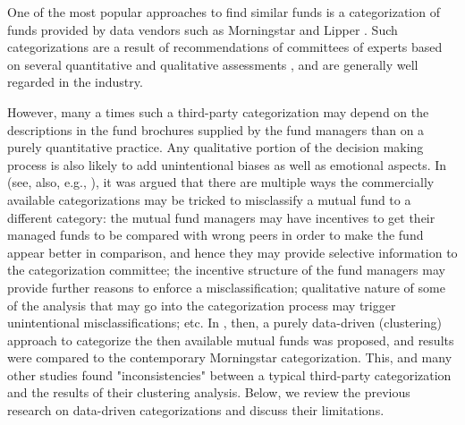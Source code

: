 \documentclass[sigconf]{acmart}
\begin{document}
One of the most popular approaches to find similar funds is a categorization of funds provided by data vendors such as Morningstar \cite{morningstarglobalcategory} and Lipper \cite{lippercategory}. Such categorizations are a result of recommendations of committees of experts based on several quantitative and qualitative assessments \cite{morningstarequitysectorbreakdown}, and are generally well regarded in the industry. 


However, many a times such a third-party categorization may depend on the descriptions in the fund brochures supplied by the fund managers than on a purely quantitative practice. Any qualitative portion of the decision making process is also likely to add unintentional biases as well as emotional aspects. In \cite{marathe1999categorizing} (see, also, e.g., \cite{orphanides1996compensation,brown1997mutual,dibartolomeo1997mutual,elton2003incentive}), it was argued that there are multiple ways the commercially available categorizations may be tricked to misclassify a mutual fund to a different category: the mutual fund managers may have incentives to get their managed funds to be compared with wrong peers in order to make the fund appear better in comparison, and hence they may provide selective information to the categorization committee; the incentive structure of the fund managers may provide further reasons to enforce a misclassification; qualitative nature of some of the analysis that may go into the categorization process may trigger unintentional misclassifications; etc. In \cite{marathe1999categorizing}, then, a purely data-driven (clustering) approach to categorize the then available mutual funds was proposed, and results were compared to the contemporary Morningstar categorization. This, and many other studies \cite{kim2000mutual,castellanos2005spanish,moreno2006self,acharya2007classifying,haslem2001morningstar,lamponi2015data} found "inconsistencies" between a typical third-party categorization and the results of their clustering analysis. Below, we review the previous research on data-driven categorizations and discuss their limitations.
\end{document}
